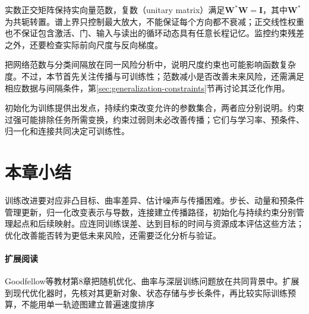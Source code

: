 实数正交矩阵保持实向量范数，复数（unitary matrix）满足$\bm W^*\bm W=\bm I$，其中$\bm W^*$为共轭转置。谱上界只控制最大放大，不能保证每个方向都不衰减；正交线性权重也不保证包含激活、门、输入与读出的循环动态具有任意长程记忆。监控约束残差之外，还要检查实际前向尺度与反向梯度。

把网络范数与分类间隔放在同一风险分析中，说明尺度约束也可能影响函数复杂度。不过，本节首先关注传播与可训练性；范数减小是否改善未来风险，还需满足相应数据与间隔条件，第\ref{sec:generalization-constraints}节再讨论其泛化作用。

初始化为训练提供出发点，持续约束改变允许的参数集合，两者应分别说明。约束过强可能排除任务所需变换，约束过弱则未必改善传播；它们与学习率、预条件、归一化和连接共同决定可训练性。

\section{本章小结}
\label{sec:training-summary}

训练改进要对应非凸目标、曲率差异、估计噪声与传播困难。步长、动量和预条件管理更新，归一化改变表示与导数，连接建立传播路径，初始化与持续约束分别管理起点和后续映射。应连同训练误差、达到目标的时间与资源成本评估这些方法；优化改善能否转为更低未来风险，还需要泛化分析与验证。

\paragraph{扩展阅读}
Goodfellow等教材第8章把随机优化、曲率与深层训练问题放在共同背景中。扩展到现代优化器时，先核对其更新对象、状态存储与步长条件，再比较实际训练预算，不能用单一轨迹图建立普遍速度排序
